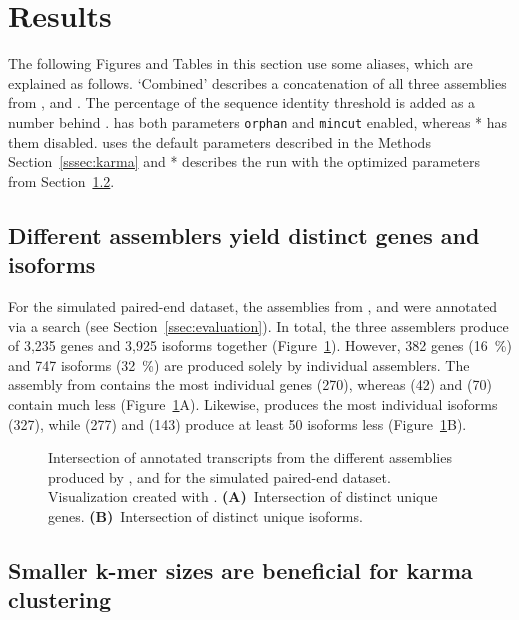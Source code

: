 \documentclass[12pt,a4paper,english]{article}
\begin{document}
\newpage
\section{Results}
	\label{sec:results}
	
	The following Figures and Tables in this section use some aliases, which are explained as follows. `Combined' describes a concatenation of all three assemblies from \spades, \soap and \trinity. The percentage of the sequence identity threshold is added as a number behind \cdhit. \grouper has both parameters \texttt{orphan} and \texttt{mincut} enabled, whereas \grouper{}* has them disabled.
	\karma uses the default parameters described in the Methods Section~\ref{sssec:karma} and \karma{}* describes the run with the optimized parameters from Section~\ref{ssec:parameter}.
	
	\subsection{Different assemblers yield distinct genes and isoforms}
	For the simulated paired-end dataset, the assemblies from \spades, \trinity and \soap were annotated via a \blast search (see Section~\ref{ssec:evaluation}).
	In total, the three assemblers produce of 3,235 genes and 3,925 isoforms together (Figure~\ref{img:difference}).
	However, 382 genes (16~\%) and 747 isoforms (32~\%) are produced solely by individual assemblers. The assembly from \spades contains the most individual genes (270), whereas \trinity (42) and \soap (70) contain much less (Figure~\ref{img:difference}A). Likewise, \spades produces the most individual isoforms (327), while \soap (277) and \trinity (143) produce at least 50 isoforms less (Figure~\ref{img:difference}B). 
	\begin{figure}[H]
		\def\svgwidth{\textwidth}
		
		\caption[Intersection of annotated transcripts from different assemblies.]{Intersection of annotated transcripts from the different assemblies produced by \spades, \soap and \trinity for the simulated paired-end \celegans dataset. Visualization created with \intervene \citep{intervene:17}. \textbf{(A)}~Intersection of distinct unique genes. \textbf{(B)}~Intersection of distinct unique isoforms.}
		\label{img:difference}
	\end{figure}
	
	\subsection{Smaller k-mer sizes are beneficial for karma clustering}
	\label{ssec:parameter}
	
\end{document}
